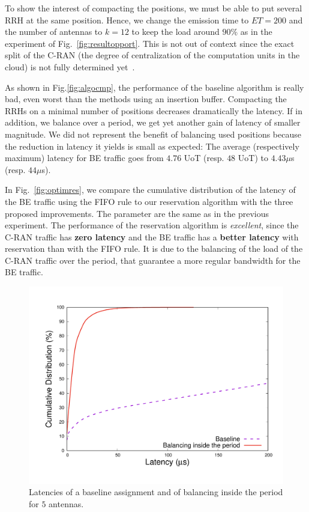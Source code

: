 \documentclass[10pt, conference, letterpaper]{IEEEtran}
\begin{document}
To show the interest of compacting the positions, we must be able to put several RRH at the same position.
Hence, we change the emission time to $ET = 200$ and the number of antennas to $k = 12$ to keep the load around $90\%$ as in the experiment of Fig.~\ref{fig:resultopport}. This is not out of context since the exact split of the C-RAN (the degree of centralization of the computation units in the cloud) is not fully determined yet~\cite{mobile2011c}. 



As shown in Fig.\ref{fig:algocmp}, the performance of the baseline algorithm is really bad, even worst than the methods using an insertion buffer. Compacting the RRHs on a minimal number of positions decreases dramatically the latency. If in addition, we balance over a period, we get yet another gain of latency of smaller magnitude.
We did not represent the benefit of balancing used positions because the reduction in latency it 
yields is small as expected: The average (respectively maximum) latency for BE traffic goes from $4.76$ UoT (resp. $48$ UoT) to $4.43\mu$s (resp. $44\mu$s). 


In Fig.~\ref{fig:optimres}, we compare the cumulative distribution of the latency of the BE traffic using the FIFO rule to our reservation algorithm with the three proposed improvements. The parameter are the same as in the previous experiment. The performance of the reservation algorithm is \emph{excellent}, since the C-RAN traffic has {\bf zero latency} and the BE traffic has a \textbf{better latency} with reservation than with the FIFO rule. It is due to the balancing of the load of the C-RAN traffic over the period, that guarantee a more regular bandwidth for the BE traffic.
  


\begin{figure}[h!]
\begin{center}   

      \includegraphics[scale=0.25]{periodonly}
     \caption{Latencies of a baseline assignment and of balancing inside the period for $5$ antennas.}  
     \label{fig:periodonly}
  \end{center}
  \end{figure}
  
\end{document}
